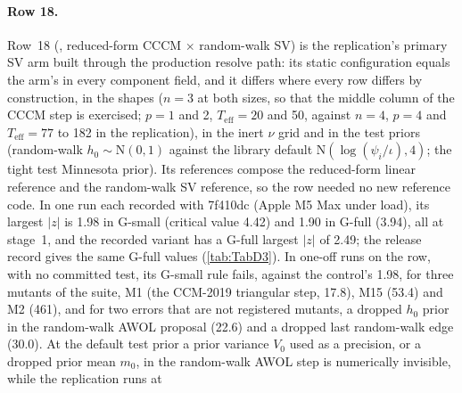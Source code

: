 \paragraph{Row 18.}\label{app:row18}
Row~18 (, reduced-form CCCM $\times$ random-walk SV) is the replication's
primary SV arm built through the production resolve path: its static configuration equals the
arm's in every component field, and it differs where every row differs by construction, in the
shapes ($n = 3$ at both sizes, so that the middle column of the CCCM step is exercised; $p = 1$ and
2, $T_{\mathrm{eff}} = 20$ and 50, against $n = 4$, $p = 4$ and $T_{\mathrm{eff}} = 77$ to 182 in
the replication), in the inert $\nu$ grid and in the test priors (random-walk $h_0 \sim
\mathrm{N}(0, 1)$ against the library default $\mathrm{N}(\log(\psi_i/\iota), 4)$; the tight test
Minnesota prior). %
Its references compose the reduced-form linear reference and the random-walk SV reference, so the
row needed no new reference code. %
In one run each recorded with 7f410dc (Apple M5 Max under load), its largest $|z|$ is 1.98 in
G-small (critical value 4.42) and 1.90 in G-full (3.94), all at stage~1, and the recorded
 variant has a G-full largest $|z|$ of 2.49; the release record gives the same
G-full values (\cref{tab:TabD3}). %
In one-off runs on the row, with no committed test, its G-small rule fails, against the control's
1.98, for three mutants of the suite, M1 (the CCM-2019 triangular step, 17.8), M15 (53.4) and M2
(461), and for two errors that are not registered mutants, a dropped $h_0$ prior in the random-walk
AWOL proposal (22.6) and a dropped last random-walk edge (30.0). %
At the default test prior a prior variance $V_0$ used as a precision, or a dropped prior mean
$m_0$, in the random-walk AWOL step is numerically invisible, while the replication runs at
